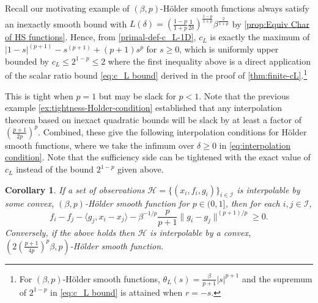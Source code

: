 \documentclass[11pt, hidelinks]{article}
\numberwithin{equation}{section}
\theoremstyle{thmstyletwo}%
\newtheorem{corollary}[thm]{Corollary}
\numberwithin{equation}{section}
\newcommand{\Ical}{\mathcal{I}}
\newcommand{\Holder}{H\"older }
\begin{document}
Recall our motivating example of $(\beta,p)$-\Holder smooth functions always satisfy an inexactly smooth bound with $L(\delta) = \left(\frac{1-p}{1+p}\frac{1}{2\delta}\right)^\frac{1-p}{1+p}\beta^\frac{2}{1+p}$ by \cref{prop:Equiv Char of HS functions}. Hence, from \eqref{primal-def-c_L-1D}, $c_L$ is exactly the maximum of $\left|1-s\right|^{\left(p+1\right)}-s^{\left(p+1\right)}+\left(p+1\right)s^{p}$ for $s \geq 0$, which is uniformly upper bounded by $c_L \leq 2^{1-p} \leq 2$
where the first inequality above is a direct application of the scalar ratio bound \eqref{eq:c_L bound} derived in the proof of \cref{thm:finite-cL}.\footnote{For $(\beta, p)$-\Holder smooth functions, $\theta_L(s) = \frac{\beta}{p+1}|s|^{p+1}$ and the supremum of $2^{1-p}$ in \eqref{eq:c_L bound} is attained when $r = -s$.}


This is tight when $p=1$ but may be slack for $p<1$. Note that the previous example \eqref{ex:tightness-Holder-condition} established that any interpolation theorem based on inexact quadratic bounds will be slack by at least a factor of $\left(\frac{p+1}{2p}\right)^p$. Combined, these give the following interpolation conditions for \Holder smooth functions, where we take the infimum over $\delta \geq 0$ in \eqref{eq:interpolation condition}.  Note that the sufficiency side can be tightened with the exact value of $c_L$ instead of the bound $2^{1-p}$ given above.



\begin{corollary}\label{cor:Holder_smooth_interp}
    If a set of observations $\mathcal{H} =\{(x_i,f_i,g_i)\}_{i\in\Ical}$ is interpolable by some convex, $(\beta,p)$-\Holder smooth function for $p \in (0,1]$, then for each $i,j\in\Ical$,
    \begin{equation}\label{eq:interpolation condition Holder}
        f_i - f_j - \langle g_j, x_i-x_j\rangle - \beta^{-1/p}\frac{p}{p+1}\|g_i-g_j\|^{(p+1)/p} \geq 0 .
    \end{equation} 
    Conversely, if the above holds then  $\mathcal{H}$ is interpolable by a convex, $\left(2\left(\frac{p+1}{4p}\right)^{p}\beta,p\right)$-\Holder smooth function.
\end{corollary}
\end{document}

